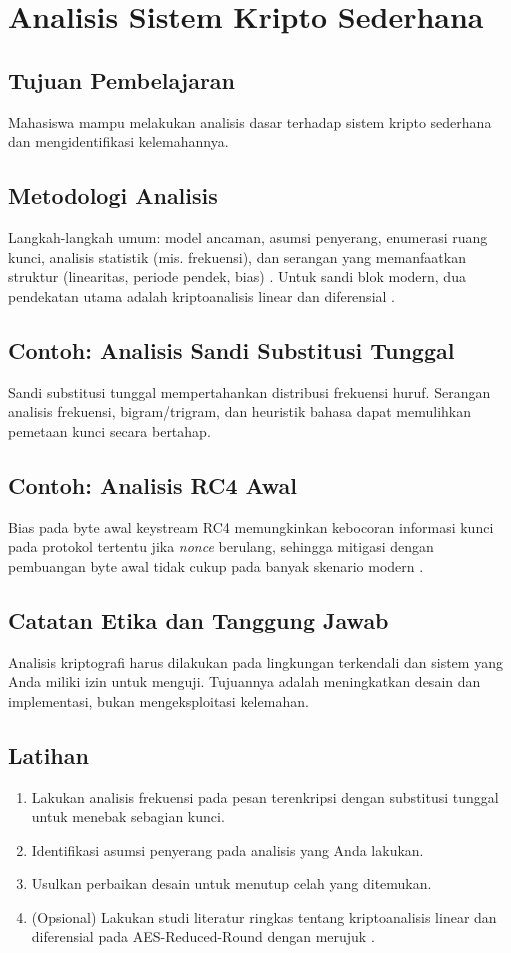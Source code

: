 \documentclass[../main.tex]{subfiles}
\begin{document}
\chapter{Analisis Sistem Kripto Sederhana}

\section{Tujuan Pembelajaran}
Mahasiswa mampu melakukan analisis dasar terhadap sistem kripto sederhana dan mengidentifikasi kelemahannya.

\section{Metodologi Analisis}
Langkah-langkah umum: model ancaman, asumsi penyerang, enumerasi ruang kunci, analisis statistik (mis. frekuensi), dan serangan yang memanfaatkan struktur (linearitas, periode pendek, bias) \citep{stallings}. Untuk sandi blok modern, dua pendekatan utama adalah kriptoanalisis linear dan diferensial \citep{heys_tutorial}.

\section{Contoh: Analisis Sandi Substitusi Tunggal}
Sandi substitusi tunggal mempertahankan distribusi frekuensi huruf. Serangan analisis frekuensi, bigram/trigram, dan heuristik bahasa dapat memulihkan pemetaan kunci secara bertahap.

\section{Contoh: Analisis RC4 Awal}
Bias pada byte awal keystream RC4 memungkinkan kebocoran informasi kunci pada protokol tertentu jika \emph{nonce} berulang, sehingga mitigasi dengan pembuangan byte awal tidak cukup pada banyak skenario modern \citep{rc4}.

\section{Catatan Etika dan Tanggung Jawab}
Analisis kriptografi harus dilakukan pada lingkungan terkendali dan sistem yang Anda miliki izin untuk menguji. Tujuannya adalah meningkatkan desain dan implementasi, bukan mengeksploitasi kelemahan.

\section{Latihan}
\begin{enumerate}
  \item Lakukan analisis frekuensi pada pesan terenkripsi dengan substitusi tunggal untuk menebak sebagian kunci.
  \item Identifikasi asumsi penyerang pada analisis yang Anda lakukan.
  \item Usulkan perbaikan desain untuk menutup celah yang ditemukan.
  \item (Opsional) Lakukan studi literatur ringkas tentang kriptoanalisis linear dan diferensial pada AES-Reduced-Round dengan merujuk \citep{heys_tutorial}.
\end{enumerate}
\end{document}
